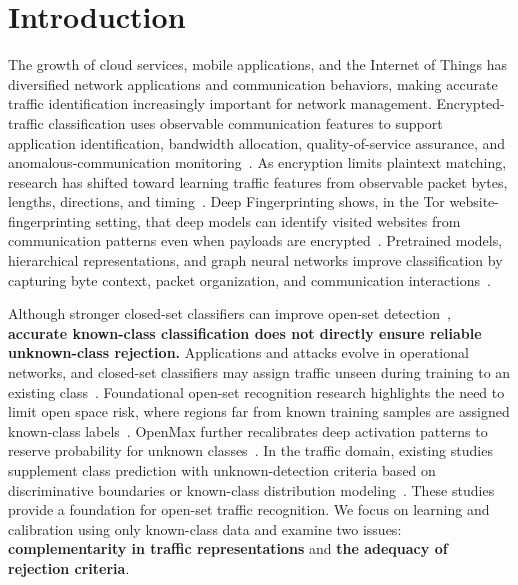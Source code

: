 \documentclass[journal]{IEEEtran}
\newcommand{\bluecite}[1]{\textcolor{blue}{\cite{#1}}}
\begin{document}
\section{Introduction}
The growth of cloud services, mobile applications, and the Internet of Things has diversified network applications and communication behaviors, making accurate traffic identification increasingly important for network management. Encrypted-traffic classification uses observable communication features to support application identification, bandwidth allocation, quality-of-service assurance, and anomalous-communication monitoring~\bluecite{ch2-1,ch2-2,ch2-5}. As encryption limits plaintext matching, research has shifted toward learning traffic features from observable packet bytes, lengths, directions, and timing~\bluecite{ch2-1,ch2-2,ch2-5}. Deep Fingerprinting shows, in the Tor website-fingerprinting setting, that deep models can identify visited websites from communication patterns even when payloads are encrypted~\bluecite{classic-df}. Pretrained models, hierarchical representations, and graph neural networks improve classification by capturing byte context, packet organization, and communication interactions~\bluecite{ch2-1,ch2-2,ch2-3,ch2-4,ch2-5,ch2-6}.

Although stronger closed-set classifiers can improve open-set detection~\bluecite{vaze-osr}, \textbf{accurate known-class classification does not directly ensure reliable unknown-class rejection.} Applications and attacks evolve in operational networks, and closed-set classifiers may assign traffic unseen during training to an existing class~\bluecite{ch2-9,ch2-10,ch2-15}. Foundational open-set recognition research highlights the need to limit open space risk, where regions far from known training samples are assigned known-class labels~\bluecite{classic-osr}. OpenMax further recalibrates deep activation patterns to reserve probability for unknown classes~\bluecite{classic-openmax}. In the traffic domain, existing studies supplement class prediction with unknown-detection criteria based on discriminative boundaries or known-class distribution modeling~\bluecite{ch2-10,ch2-13,ch2-14,ch2-15}. These studies provide a foundation for open-set traffic recognition. We focus on learning and calibration using only known-class data and examine two issues: \textbf{complementarity in traffic representations} and \textbf{the adequacy of rejection criteria}.
\end{document}
